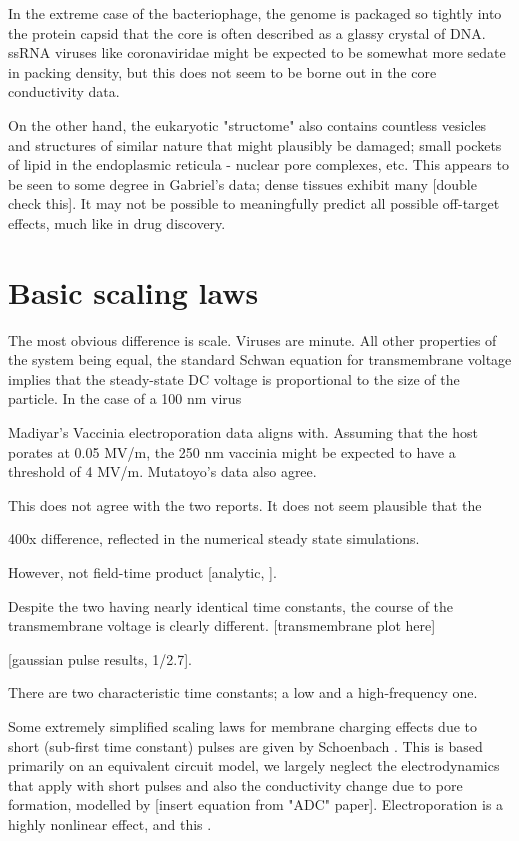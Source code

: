 \documentclass[fleqn,10pt]{paper}
\begin{document}
In the extreme case of the bacteriophage, the genome is packaged so tightly into the protein capsid that the core is often described as a glassy crystal of DNA\cite{Conformation2007}. ssRNA viruses like coronaviridae might be expected to be somewhat more sedate in packing density, but this does not seem to be borne out in the core conductivity data.

On the other hand, the eukaryotic "structome" also contains countless vesicles and structures of similar nature that might plausibly be damaged; small pockets of lipid in the endoplasmic reticula - nuclear pore complexes, etc. This appears to be seen to some degree in Gabriel's data; dense tissues exhibit many [double check this]. It may not be possible to meaningfully predict all possible off-target effects, much like in drug discovery.

\section*{Basic scaling laws}

The most obvious difference is scale. Viruses are minute. All other properties of the system being equal, the standard Schwan equation for transmembrane voltage implies that the steady-state DC voltage is proportional to the size of the particle. In the case of a 100 nm virus 



Madiyar's Vaccinia electroporation data aligns with. Assuming that the host porates at 0.05 MV/m, the 250 nm vaccinia might be expected to have a threshold of 4 MV/m. Mutatoyo's data also agree.  

This does not agree with the two reports. It does not seem plausible that the 


400x difference, reflected in the numerical steady state simulations.

However, not field-time product [analytic, ]. 

Despite the two having nearly identical time constants, the course of the transmembrane voltage is clearly different.
[transmembrane plot here]

[gaussian pulse results, 1/2.7]. 


There are two characteristic time constants; a low and a high-frequency one.

Some extremely simplified scaling laws for membrane charging effects due to short (sub-first time constant) pulses are given by Schoenbach \cite{Bioelectric2007}. This is based primarily on an equivalent circuit model, we largely neglect the electrodynamics that apply with short pulses and also the conductivity change due to pore formation, modelled by [insert equation from "ADC" paper]. Electroporation is a highly nonlinear effect\cite{Letter1974}, and this .
\end{document}

